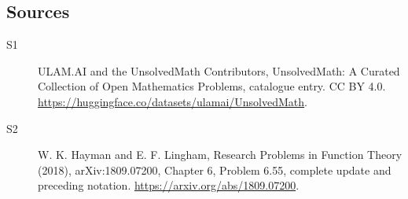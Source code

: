 \documentclass[11pt]{article}
\begin{document}
\subsection{Sources}
\begin{description}
\item[\hypertarget{source:statement:1}{S1}] ULAM.AI and the UnsolvedMath Contributors, UnsolvedMath: A Curated Collection of Open Mathematics Problems, catalogue entry. CC BY 4.0. \url{https://huggingface.co/datasets/ulamai/UnsolvedMath}.
\item[\hypertarget{source:statement:2}{S2}] W. K. Hayman and E. F. Lingham, Research Problems in Function Theory (2018), arXiv:1809.07200, Chapter 6, Problem 6.55, complete update and preceding notation. \url{https://arxiv.org/abs/1809.07200}.
\end{description}
\label{end:statement}
\end{document}
